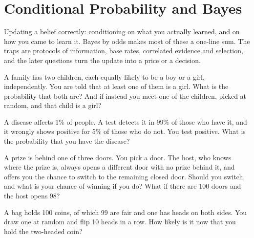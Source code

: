 \chapter{Conditional Probability and Bayes}\label{ch:iv1:conditional-probability-and-bayes}

\begin{ivtrains}
Updating a belief correctly: conditioning on what you actually learned, and on how you came to learn it. Bayes by odds makes most
of these a one-line sum. The traps are protocols of information, base rates, correlated evidence and selection, and the later
questions turn the update into a price or a decision.
\end{ivtrains}

\begin{question}\label{iq:iv1:conditional-probability-and-bayes:1}
A family has two children, each equally likely to be a boy or a girl, independently. You are told that at least one of them is a girl. What is the probability that both are? And if instead you meet one of the children, picked at random, and that child is a girl?
\end{question}

\begin{question}\label{iq:iv1:conditional-probability-and-bayes:2}
A disease affects 1\% of people. A test detects it in 99\% of those who have it, and it wrongly shows positive for 5\% of those who do not. You test positive. What is the probability that you have the disease?
\end{question}

\begin{question}\label{iq:iv1:conditional-probability-and-bayes:3}
A prize is behind one of three doors. You pick a door. The host, who knows where the prize is, always opens a different door with no prize behind it, and offers you the chance to switch to the remaining closed door. Should you switch, and what is your chance of winning if you do? What if there are 100 doors and the host opens 98?
\end{question}

\begin{question}\label{iq:iv1:conditional-probability-and-bayes:4}
A bag holds 100 coins, of which 99 are fair and one has heads on both sides. You draw one at random and flip 10 heads in a row. How likely is it now that you hold the two-headed coin?
\end{question}

